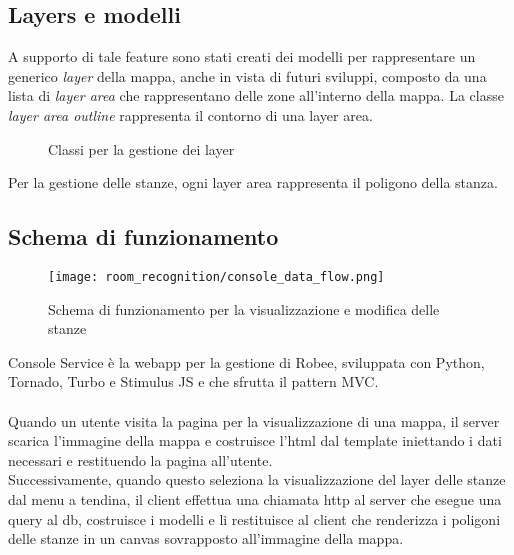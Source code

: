 \subsection{Layers e modelli}
A supporto di tale feature sono stati creati dei modelli per rappresentare un generico \textit{layer} della mappa, anche in vista di futuri sviluppi, composto da una lista di \textit{layer area} che rappresentano delle zone all'interno della mappa. La classe \textit{layer area outline} rappresenta il contorno di una layer area.
\begin{figure}[H]
  \centering
  \caption{Classi per la gestione dei layer}
\end{figure}
\noindent
Per la gestione delle stanze, ogni layer area rappresenta il poligono della stanza.

\subsection{Schema di funzionamento}
\begin{figure}[H]
  \centering
  \texttt{[image: room\_recognition/console\_data\_flow.png]}
  \caption{Schema di funzionamento per la visualizzazione e modifica delle stanze}
\end{figure}
Console Service è la webapp per la gestione di Robee, sviluppata con Python, Tornado, Turbo e Stimulus JS e che sfrutta il pattern MVC.\\\\
Quando un utente visita la pagina per la visualizzazione di una mappa, il server scarica l'immagine della mappa e costruisce l'html dal template iniettando i dati necessari e restituendo la pagina all'utente.\\ Successivamente, quando questo seleziona la visualizzazione del layer delle stanze dal menu a tendina, il client effettua una chiamata http  al server che esegue una query al db, costruisce i modelli e li restituisce al client che renderizza i poligoni delle stanze in un canvas sovrapposto all'immagine della mappa.\\
